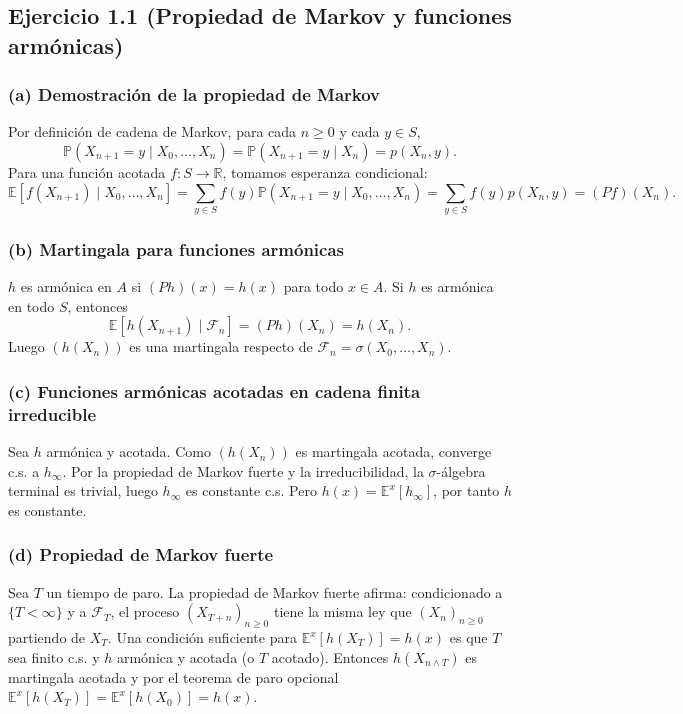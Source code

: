 \documentclass[letterpaper, 12pt]{article}
\newcommand{\E}{\mathbb{E}}
\renewcommand{\P}{\mathbb{P}}
\newcommand{\R}{\mathbb{R}}
\newcommand{\F}{\mathcal{F}}
\newcommand{\1}{\mathbbm{1}}
\begin{document}
    \subsection{Ejercicio 1.1 (Propiedad de Markov y funciones arm\'onicas)}

    \subsubsection*{(a) Demostraci\'on de la propiedad de Markov}
    Por definici\'on de cadena de Markov, para cada $n\ge0$ y cada $y\in S$,
    \[
    \P(X_{n+1}=y\mid X_0,\dots,X_n)=\P(X_{n+1}=y\mid X_n)=p(X_n,y).
    \]
    Para una funci\'on acotada $f:S\to\R$, tomamos esperanza condicional:
    \[
    \E[f(X_{n+1})\mid X_0,\dots,X_n]=\sum_{y\in S}f(y)\P(X_{n+1}=y\mid X_0,\dots,X_n)
    =\sum_{y\in S}f(y)p(X_n,y)=(Pf)(X_n).
    \]

    \subsubsection*{(b) Martingala para funciones arm\'onicas}
    $h$ es arm\'onica en $A$ si $(Ph)(x)=h(x)$ para todo $x\in A$. Si $h$ es arm\'onica en todo $S$, entonces
    \[
    \E[h(X_{n+1})\mid\F_n]=(Ph)(X_n)=h(X_n).
    \]
    Luego $(h(X_n))$ es una martingala respecto de $\F_n=\sigma(X_0,\dots,X_n)$.

    \subsubsection*{(c) Funciones arm\'onicas acotadas en cadena finita irreducible}
    Sea $h$ arm\'onica y acotada. Como $(h(X_n))$ es martingala acotada, converge c.s. a $h_\infty$. Por la propiedad de Markov fuerte y la irreducibilidad, la $\sigma$-álgebra terminal es trivial, luego $h_\infty$ es constante c.s. Pero $h(x)=\E^x[h_\infty]$, por tanto $h$ es constante.

    \subsubsection*{(d) Propiedad de Markov fuerte}
    Sea $T$ un tiempo de paro. La propiedad de Markov fuerte afirma: condicionado a $\{T<\infty\}$ y a $\F_T$, el proceso $(X_{T+n})_{n\ge0}$ tiene la misma ley que $(X_n)_{n\ge0}$ partiendo de $X_T$. Una condici\'on suficiente para $\E^x[h(X_T)]=h(x)$ es que $T$ sea finito c.s. y $h$ arm\'onica y acotada (o $T$ acotado). Entonces $h(X_{n\wedge T})$ es martingala acotada y por el teorema de paro opcional $\E^x[h(X_T)]=\E^x[h(X_0)]=h(x)$.
\end{document}
